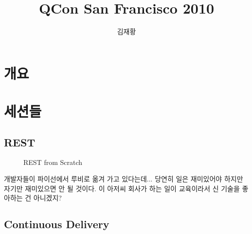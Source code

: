 \documentclass[a4paper]{article}
\title{QCon San Francisco 2010}
\author{김재황}
\begin{document}
\maketitle

\section{개요}

\section{세션들}

\subsection{REST}

\begin{figure}[t]
    \begin{Frame}
        \begin{center}
        \end{center}
    \end{Frame}
    \caption{REST from Scratch}
    \label{REST}
\end{figure}

개발자들이 파이선에서 루비로 옮겨 가고 있다는데... 당연히 일은
재미있어야 하지만 자기만 재미있으면 안 될 것이다. 이 아저씨 회사가 하는
일이 교육이라서 신 기술을 좋아하는 건 아니겠지?

\subsection{Continuous Delivery}

\begin{figure}
\end{figure}
\end{document}
